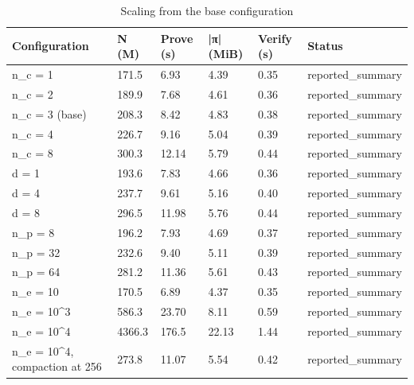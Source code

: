 \begin{table}[t]
\centering
\caption{Scaling from the base configuration}
\begin{tabular}{llllll}
\hline
Configuration & N (M) & Prove (s) & |π| (MiB) & Verify (s) & Status \\
\hline
n\_c = 1 & 171.5 & 6.93 & 4.39 & 0.35 & reported\_summary \\
n\_c = 2 & 189.9 & 7.68 & 4.61 & 0.36 & reported\_summary \\
n\_c = 3 (base) & 208.3 & 8.42 & 4.83 & 0.38 & reported\_summary \\
n\_c = 4 & 226.7 & 9.16 & 5.04 & 0.39 & reported\_summary \\
n\_c = 8 & 300.3 & 12.14 & 5.79 & 0.44 & reported\_summary \\
d = 1 & 193.6 & 7.83 & 4.66 & 0.36 & reported\_summary \\
d = 4 & 237.7 & 9.61 & 5.16 & 0.40 & reported\_summary \\
d = 8 & 296.5 & 11.98 & 5.76 & 0.44 & reported\_summary \\
n\_p = 8 & 196.2 & 7.93 & 4.69 & 0.37 & reported\_summary \\
n\_p = 32 & 232.6 & 9.40 & 5.11 & 0.39 & reported\_summary \\
n\_p = 64 & 281.2 & 11.36 & 5.61 & 0.43 & reported\_summary \\
n\_e = 10 & 170.5 & 6.89 & 4.37 & 0.35 & reported\_summary \\
n\_e = 10^3 & 586.3 & 23.70 & 8.11 & 0.59 & reported\_summary \\
n\_e = 10^4 & 4366.3 & 176.5 & 22.13 & 1.44 & reported\_summary \\
n\_e = 10^4, compaction at 256 & 273.8 & 11.07 & 5.54 & 0.42 & reported\_summary \\
\hline
\end{tabular}
\end{table}
